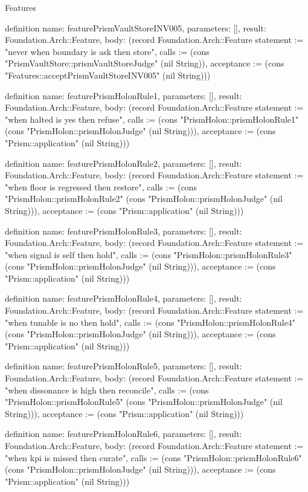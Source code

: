 \begin{lexlean}{Features}
\begin{semanticmodule}
definition{
  name: featurePrismVaultStoreINV005,
  parameters: [],
  result: Foundation.Arch::Feature,
  body: (record Foundation.Arch::Feature {statement := "never when boundary is ask then store", calls := (cons "PrismVaultStore::prismVaultStoreJudge" (nil String)), acceptance := (cons "Features::acceptPrismVaultStoreINV005" (nil String))})
}

definition{
  name: featurePrismHolonRule1,
  parameters: [],
  result: Foundation.Arch::Feature,
  body: (record Foundation.Arch::Feature {statement := "when halted is yes then refuse", calls := (cons "PrismHolon::prismHolonRule1" (cons "PrismHolon::prismHolonJudge" (nil String))), acceptance := (cons "Prism::application" (nil String))})
}

definition{
  name: featurePrismHolonRule2,
  parameters: [],
  result: Foundation.Arch::Feature,
  body: (record Foundation.Arch::Feature {statement := "when floor is regressed then restore", calls := (cons "PrismHolon::prismHolonRule2" (cons "PrismHolon::prismHolonJudge" (nil String))), acceptance := (cons "Prism::application" (nil String))})
}

definition{
  name: featurePrismHolonRule3,
  parameters: [],
  result: Foundation.Arch::Feature,
  body: (record Foundation.Arch::Feature {statement := "when signal is self then hold", calls := (cons "PrismHolon::prismHolonRule3" (cons "PrismHolon::prismHolonJudge" (nil String))), acceptance := (cons "Prism::application" (nil String))})
}

definition{
  name: featurePrismHolonRule4,
  parameters: [],
  result: Foundation.Arch::Feature,
  body: (record Foundation.Arch::Feature {statement := "when tunable is no then hold", calls := (cons "PrismHolon::prismHolonRule4" (cons "PrismHolon::prismHolonJudge" (nil String))), acceptance := (cons "Prism::application" (nil String))})
}

definition{
  name: featurePrismHolonRule5,
  parameters: [],
  result: Foundation.Arch::Feature,
  body: (record Foundation.Arch::Feature {statement := "when dissonance is high then reconcile", calls := (cons "PrismHolon::prismHolonRule5" (cons "PrismHolon::prismHolonJudge" (nil String))), acceptance := (cons "Prism::application" (nil String))})
}

definition{
  name: featurePrismHolonRule6,
  parameters: [],
  result: Foundation.Arch::Feature,
  body: (record Foundation.Arch::Feature {statement := "when kpi is missed then curate", calls := (cons "PrismHolon::prismHolonRule6" (cons "PrismHolon::prismHolonJudge" (nil String))), acceptance := (cons "Prism::application" (nil String))})
}


\end{semanticmodule}
\end{lexlean}

